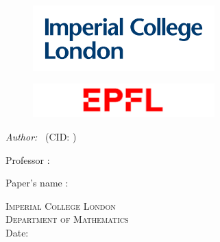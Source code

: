 \begin{titlepage}

\begin{figure}[!htb]
   \begin{minipage}{0.48\textwidth}
	  \includegraphics[width = 7cm]{LOGO.png} \\[1cm]
   \end{minipage}\hfill
   \begin{minipage}{0.48\textwidth}
	  \includegraphics[width = 7cm]{LOGOEPFL.png} \\
   \end{minipage}
\end{figure}

\begin{flushleft} \large
\vspace*{2 cm}
{\huge \bfseries \reporttitle} 
\vspace*{1.5 cm}

\textit{Author:} \reportauthor~(CID: \cid) 
\vspace*{1.5 cm}

{ Professor : \professor }

{Paper's name : \course}
\end{flushleft}

\vspace*{5 cm}
\begin{center}
\textsc{\Large Imperial College London}\\[0.5cm] 
\textsc{\large Department of Mathematics}\\[0.5cm] 
\makeatletter
Date: \@date 
\makeatother


\end{center}

\vfill %






\end{titlepage}